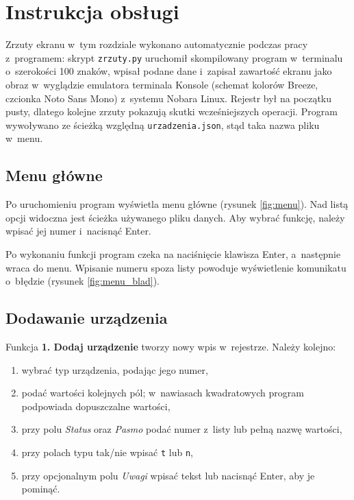 \chapter{Instrukcja obsługi}\label{ch:instrukcja}

Zrzuty ekranu w~tym rozdziale wykonano automatycznie podczas pracy z~programem: skrypt \texttt{zrzuty.py} uruchomił skompilowany program w~terminalu o~szerokości 100 znaków, wpisał podane dane i~zapisał zawartość ekranu jako obraz w~wyglądzie emulatora terminala Konsole (schemat kolorów Breeze, czcionka Noto Sans Mono) z~systemu Nobara Linux. Rejestr był na początku pusty, dlatego kolejne zrzuty pokazują skutki wcześniejszych operacji. Program wywoływano ze ścieżką względną \texttt{urzadzenia.json}, stąd taka nazwa pliku w~menu.

\section{Menu główne}

Po uruchomieniu program wyświetla menu główne (rysunek \ref{fig:menu}). Nad listą opcji widoczna jest ścieżka używanego pliku danych. Aby wybrać funkcję, należy wpisać jej numer i~nacisnąć Enter.


Po wykonaniu funkcji program czeka na naciśnięcie klawisza Enter, a~następnie wraca do menu. Wpisanie numeru spoza listy powoduje wyświetlenie komunikatu o~błędzie (rysunek \ref{fig:menu_blad}).


\section{Dodawanie urządzenia}

Funkcja \textbf{1. Dodaj urządzenie} tworzy nowy wpis w~rejestrze. Należy kolejno:

\begin{enumerate}
	\item wybrać typ urządzenia, podając jego numer,
	\item podać wartości kolejnych pól; w~nawiasach kwadratowych program podpowiada dopuszczalne wartości,
	\item przy polu \textit{Status} oraz \textit{Pasmo} podać numer z~listy lub pełną nazwę wartości,
	\item przy polach typu tak/nie wpisać \texttt{t} lub \texttt{n},
	\item przy opcjonalnym polu \textit{Uwagi} wpisać tekst lub nacisnąć Enter, aby je pominąć.
\end{enumerate}

